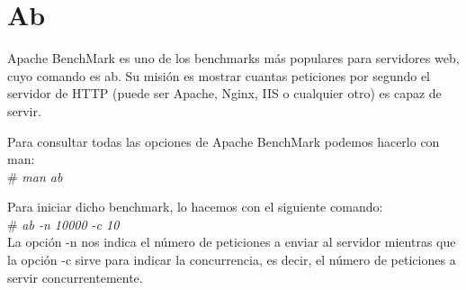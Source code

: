 \newpage
\section{Ab}

Apache BenchMark es uno de los benchmarks más populares para servidores web, cuyo comando es ab.
Su misión es mostrar cuantas peticiones por segundo el servidor de HTTP (puede ser Apache, Nginx, IIS o cualquier otro) es capaz de servir.

Para consultar todas las opciones de Apache BenchMark podemos hacerlo con man: \\
\# \textit{man ab} 




Para iniciar dicho benchmark, lo hacemos con el siguiente comando: \\
\# \textit{ab -n 10000 -c 10} \\

La opción -n nos indica el número de peticiones a enviar al servidor mientras que la opción -c sirve para indicar la concurrencia, es decir, el número de peticiones a servir concurrentemente.


